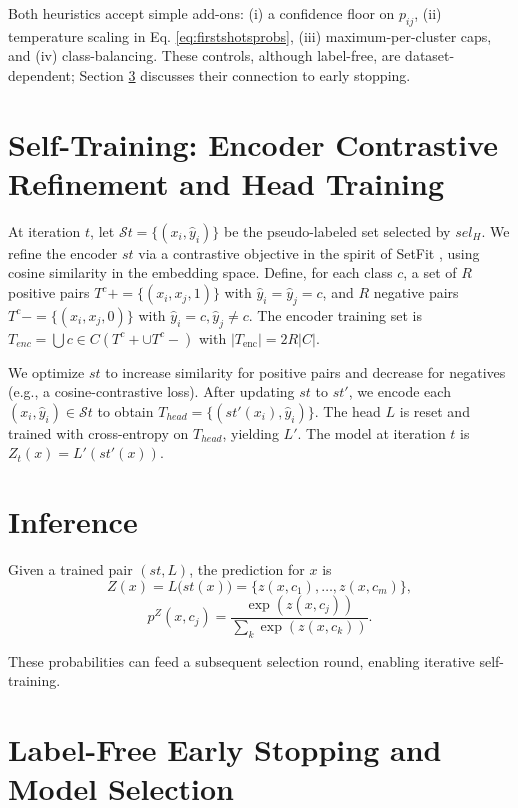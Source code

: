 \documentclass[]{politex-xico}
\begin{document}
Both heuristics accept simple add-ons: (i) a confidence floor on $p_{ij}$, (ii) temperature scaling in Eq. \ref{eq:firstshotsprobs}, (iii) maximum-per-cluster caps, and (iv) class-balancing. These controls, although label-free, are dataset-dependent; Section \ref{sec:stopping} discusses their connection to early stopping.

\section{Self-Training: Encoder Contrastive Refinement and Head Training}
\label{sec:selftraining}

At iteration $t$, let $\mathcal{S}t=\{(x_i,\hat{y}_i)\}$ be the pseudo-labeled set selected by $sel_H$. We refine the encoder $st$ via a contrastive objective in the spirit of SetFit \cite{setfit}, using cosine similarity in the embedding space. Define, for each class $c$, a set of $R$ positive pairs $T^{c}{+}=\{(x_i,x_j,1)\}$ with $\hat{y}_i=\hat{y}_j=c$, and $R$ negative pairs $T^{c}{-}=\{(x_i,x_j,0)\}$ with $\hat{y}_i=c,\hat{y}_j\neq c$. The encoder training set is $T_{enc}=\bigcup{c\in C}(T^{c}{+}\cup T^{c}{-})$ with $|T_{\text{enc}}|=2R|C|$.

We optimize $st$ to increase similarity for positive pairs and decrease for negatives (e.g., a cosine-contrastive loss). After updating $st$ to $st'$, we encode each $(x_i,\hat{y}_i)\in\mathcal{S}t$ to obtain $T_{head}=\{(st'(x_i),\hat{y}_i)\}$. The head $L$ is reset and trained with cross-entropy on $T_{head}$, yielding $L'$. The model at iteration $t$ is $Z_t(x)=L'(st'(x))$.

\section{Inference}
\label{sec:inference}

Given a trained pair $(st,L)$, the prediction for $x$ is
\begin{equation}
Z(x) = L\big(st(x)\big) = \{ z(x,c_1),\dots,z(x,c_m)\},
\end{equation}
\begin{equation}
p^Z(x,c_j) = \frac{\exp(z(x,c_j))}{\sum_k \exp(z(x,c_k))}.
\end{equation}

These probabilities can feed a subsequent selection round, enabling iterative self-training.

\section{Label-Free Early Stopping and Model Selection}
\label{sec:stopping}
\end{document}
